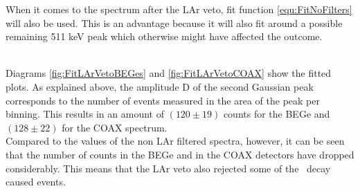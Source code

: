\documentclass[encoding=utf8,british]{tumphthesis}
\begin{document}
When it comes to the spectrum after the LAr veto, fit function \ref{equ:FitNoFilters} will also be used.
This is an advantage because it will also fit around a possible remaining 511 keV peak which otherwise might have affected the outcome.

\\

Diagrams \ref{fig:FitLArVetoBEGes} and \ref{fig:FitLArVetoCOAX} show the fitted plots.
As explained above, the amplitude D of the second Gaussian peak corresponds to the number of events measured in the area of the peak per binning.
This results in an amount of $(120\pm19)$ counts for the BEGe and $(128\pm22)$ for the COAX spectrum.
\\

Compared to the values of the non LAr filtered spectra, however, it can be seen that the number of counts in the BEGe and in the COAX detectors have dropped considerably.
This means that the LAr veto also rejected some of the \Kr\ decay caused events.
\\
\end{document}
